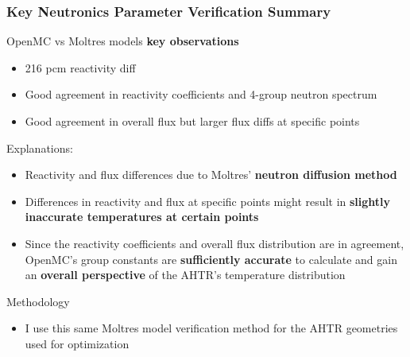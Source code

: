 \begin{frame}
    \frametitle{Key Neutronics Parameter Verification Summary}
    OpenMC vs Moltres models \textbf{key observations} 
    \begin{itemize}
        \item 216 pcm reactivity diff 
        \item Good agreement in reactivity coefficients and 4-group neutron spectrum
        \item Good agreement in overall flux but larger flux diffs at specific points
    \end{itemize}
    Explanations: 
    \begin{itemize}
        \item Reactivity and flux differences due to Moltres' \textbf{neutron diffusion 
        method} 
        \item Differences in reactivity and flux at specific points might result in 
        \textbf{slightly inaccurate temperatures at certain points}
        \item Since the reactivity coefficients and overall flux distribution 
        are in agreement, OpenMC's group constants are \textbf{sufficiently accurate} 
        to calculate and gain an \textbf{overall perspective} of the AHTR's temperature 
        distribution
    \end{itemize}
    Methodology 
    \begin{itemize}
        \item I use this same Moltres model verification method for the AHTR geometries 
        used for optimization 
    \end{itemize}
\end{frame}

